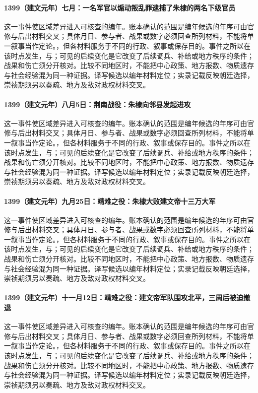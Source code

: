 \paragraph{1399（建文元年）七月：一名军官以煽动叛乱罪逮捕了朱棣的两名下级官员} 这一事件使区域差异进入可核查的编年。账本确认的范围是编年候选的年序可由官修与后出材料交叉；具体月日、参与者、战果或数字必须回查所列材料，不能将单一叙事当作定论。，但各材料服务于不同的行政、叙事或保存目的。事件之所以在该时点发生，与；可见的后续变化是它改变了后续调兵、补给或地方秩序的条件；战果和伤亡须分开核对。比较不同地区时，不能把中心政策、地方报数、物质遗存与社会经验混为同一种证据。译写候选以编年材料定位；实录记载反映朝廷选择，崇祯期须另以奏疏、地方及敌对政权材料交叉。

\paragraph{1399（建文元年）八月5日：荆南战役：朱棣向邻县发起进攻} 这一事件使区域差异进入可核查的编年。账本确认的范围是编年候选的年序可由官修与后出材料交叉；具体月日、参与者、战果或数字必须回查所列材料，不能将单一叙事当作定论。，但各材料服务于不同的行政、叙事或保存目的。事件之所以在该时点发生，与；可见的后续变化是它改变了后续调兵、补给或地方秩序的条件；战果和伤亡须分开核对。比较不同地区时，不能把中心政策、地方报数、物质遗存与社会经验混为同一种证据。译写候选以编年材料定位；实录记载反映朝廷选择，崇祯期须另以奏疏、地方及敌对政权材料交叉。

\paragraph{1399（建文元年）九月25日：靖难之役：朱棣大败建文帝十三万大军} 这一事件使区域差异进入可核查的编年。账本确认的范围是编年候选的年序可由官修与后出材料交叉；具体月日、参与者、战果或数字必须回查所列材料，不能将单一叙事当作定论。，但各材料服务于不同的行政、叙事或保存目的。事件之所以在该时点发生，与；可见的后续变化是它改变了后续调兵、补给或地方秩序的条件；战果和伤亡须分开核对。比较不同地区时，不能把中心政策、地方报数、物质遗存与社会经验混为同一种证据。译写候选以编年材料定位；实录记载反映朝廷选择，崇祯期须另以奏疏、地方及敌对政权材料交叉。

\paragraph{1399（建文元年）十一月12日：靖难之役：建文帝军队围攻北平，三周后被迫撤退} 这一事件使区域差异进入可核查的编年。账本确认的范围是编年候选的年序可由官修与后出材料交叉；具体月日、参与者、战果或数字必须回查所列材料，不能将单一叙事当作定论。，但各材料服务于不同的行政、叙事或保存目的。事件之所以在该时点发生，与；可见的后续变化是它改变了后续调兵、补给或地方秩序的条件；战果和伤亡须分开核对。比较不同地区时，不能把中心政策、地方报数、物质遗存与社会经验混为同一种证据。译写候选以编年材料定位；实录记载反映朝廷选择，崇祯期须另以奏疏、地方及敌对政权材料交叉。

